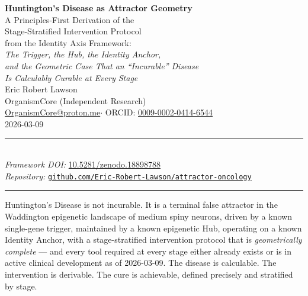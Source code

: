 \documentclass[12pt,a4paper]{article}
\newenvironment{claimenv}{%
  \begin{tcolorbox}[
    colback=claimbox,
    colframe=claimbox,
    coltext=white,
    boxrule=0pt,
    arc=3pt,
    left=8pt, right=8pt,
    top=6pt, bottom=6pt,
    breakable
  ]
  \bfseries\centering
}{%
  \end{tcolorbox}
}
\begin{document}

\begin{center}
  {\LARGE\bfseries\color{headerblue}
    Huntington's Disease as Attractor Geometry}\\[0.6em]

  {\large
    A Principles-First Derivation of the\\
    Stage-Stratified Intervention Protocol\\
    from the Identity Axis Framework:\\[0.4em]
    \textit{The Trigger, the Hub, the Identity Anchor,\\
    and the Geometric Case That an ``Incurable'' Disease\\
    Is Calculably Curable at Every Stage}}\\[1.0em]

  {\normalsize Eric Robert Lawson}\\[0.2em]
  {\small
    OrganismCore (Independent Research)\\
    \href{mailto:OrganismCore@proton.me}
      {OrganismCore@proton.me}\quad$\cdot$\quad
    ORCID:
    \href{https://orcid.org/0009-0002-0414-6544}
      {0009-0002-0414-6544}}\\[0.5em]

  {\small 2026-03-09}\\[0.7em]

  \rule{0.6\linewidth}{0.4pt}\\[0.5em]

  {\footnotesize
    \textit{Framework DOI:}\;
    \href{https://doi.org/10.5281/zenodo.18898788}
      {10.5281/zenodo.18898788}\\[0.2em]
    \textit{Repository:}\;
    \href{https://github.com/Eric-Robert-Lawson/attractor-oncology}
      {\texttt{github.com/Eric-Robert-Lawson/attractor-oncology}}
  }\\[0.5em]
  \rule{0.6\linewidth}{0.4pt}
\end{center}

\vspace{0.5em}

\begin{claimenv}
Huntington's Disease is not incurable.
It is a terminal false attractor in the Waddington
epigenetic landscape of medium spiny neurons, driven by a
known single-gene trigger, maintained by a known epigenetic
Hub, operating on a known Identity Anchor, with a
stage-stratified intervention protocol that is
\emph{geometrically complete} --- and every tool required
at every stage either already exists or is in active
clinical development as of 2026-03-09.
The disease is calculable. The intervention is derivable.
The cure is achievable, defined precisely and stratified
by stage.
\end{claimenv}
\end{document}
